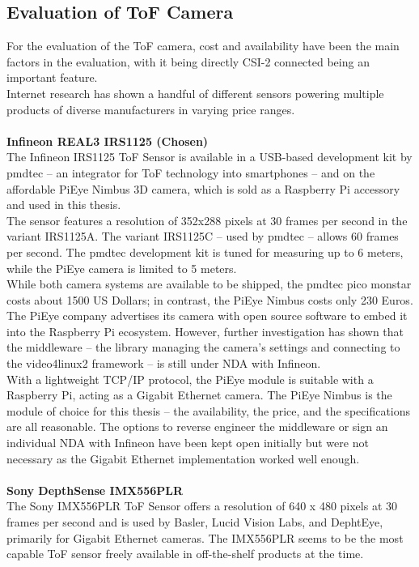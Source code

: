 \subsection{Evaluation of ToF Camera}
\label{sec:CamEvaluation}
For the evaluation of the ToF camera, cost and availability have been the main factors in the evaluation, with it being directly CSI-2 connected being an important feature.\\
Internet research has shown a handful of different sensors powering multiple products of diverse manufacturers in varying price ranges. \\
\\
\textbf{Infineon REAL3 IRS1125 (Chosen)}\\
The Infineon IRS1125 ToF Sensor is available in a USB-based development kit by pmdtec – an integrator for ToF technology into smartphones – and on the affordable PiEye Nimbus 3D camera, which is sold as a Raspberry Pi accessory and used in this thesis.\\
The sensor features a resolution of 352x288 pixels at 30 frames per second in the variant IRS1125A. The variant IRS1125C – used by pmdtec – allows 60 frames per second. The pmdtec development kit is tuned for measuring up to 6 meters, while the PiEye camera is limited to 5 meters.\\
While both camera systems are available to be shipped, the pmdtec pico monstar costs about 1500 US Dollars; in contrast, the PiEye Nimbus costs only 230 Euros. The PiEye company advertises its camera with open source software to embed it into the Raspberry Pi ecosystem. However, further investigation has shown that the middleware – the library managing the camera’s settings and connecting to the video4linux2 framework – is still under NDA with Infineon. \\
With a lightweight TCP/IP protocol, the PiEye module is suitable with a Raspberry Pi, acting as a Gigabit Ethernet camera. The PiEye Nimbus is the module of choice for this thesis – the availability, the price, and the specifications are all reasonable. The options to reverse engineer the middleware or sign an individual NDA with Infineon have been kept open initially but were not necessary as the Gigabit Ethernet implementation worked well enough.\\
\\
\textbf{Sony DepthSense IMX556PLR}\\
The Sony IMX556PLR ToF Sensor offers a resolution of 640 x 480 pixels at 30 frames per second and is used by Basler, Lucid Vision Labs, and DephtEye, primarily for Gigabit Ethernet cameras. The IMX556PLR seems to be the most capable ToF sensor freely available in off-the-shelf products at the time.  \\
